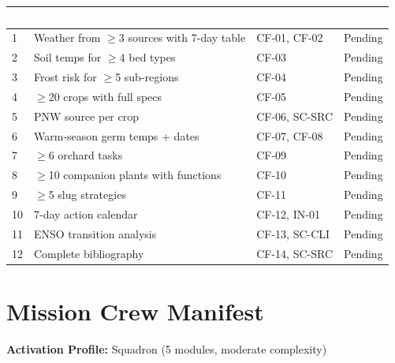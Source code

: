 \documentclass[11pt,letterpaper]{article}
\newcommand{\tableheader}[1]{\textbf{\sffamily\textcolor{white}{#1}}}
\begin{document}
\begin{center}
\begin{tabularx}{\textwidth}{C{0.5cm}X L{3cm}C{1.5cm}}
\toprule
{}
\tableheader{\#} & \tableheader{Success Criterion} & \tableheader{Test ID(s)} & \tableheader{Status} \\
 & Weather from $\geq$3 sources with 7-day table & CF-01, CF-02 & Pending \\
2 & Soil temps for $\geq$4 bed types & CF-03 & Pending \\
3 & Frost risk for $\geq$5 sub-regions & CF-04 & Pending \\
4 & $\geq$20 crops with full specs & CF-05 & Pending \\
5 & PNW source per crop & CF-06, SC-SRC & Pending \\
6 & Warm-season germ temps + dates & CF-07, CF-08 & Pending \\
7 & $\geq$6 orchard tasks & CF-09 & Pending \\
8 & $\geq$10 companion plants with functions & CF-10 & Pending \\
9 & $\geq$5 slug strategies & CF-11 & Pending \\
10 & 7-day action calendar & CF-12, IN-01 & Pending \\
11 & ENSO transition analysis & CF-13, SC-CLI & Pending \\
12 & Complete bibliography & CF-14, SC-SRC & Pending \\
\bottomrule
\end{tabularx}
\end{center}

\section{Mission Crew Manifest}

\textbf{Activation Profile:} Squadron (5 modules, moderate complexity)
\end{document}
